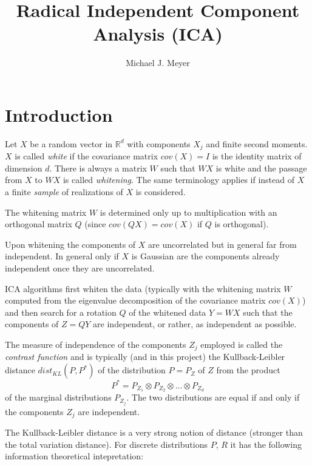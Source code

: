 \documentclass[
10pt,
fleqn,
nosumlimits,
nointlimits,
nonamelimits
]
{article}
\newcommand\bbR{{\mathbb R}}
\begin{document}
\title{Radical Independent Component Analysis (ICA)}
\author{Michael J. Meyer}


\maketitle


\section{Introduction}

Let $X$ be a random vector in $\bbR^d$ with components $X_j$ and finite second moments. 
$X$ is called \textit{white} if the covariance matrix $cov(X)=I$ is the identity matrix of dimension $d$. 
There is always a matrix $W$ such that $WX$ is white and the passage from $X$ to $WX$ is called \textit{whitening}.
The same terminology applies if instead of $X$ a finite \textit{sample} of realizations of $X$ is considered.

The whitening matrix $W$ is determined only up to multiplication with an orthogonal matrix $Q$
(since $cov(QX)=cov(X)$ if $Q$ is orthogonal).

Upon whitening the components of $X$ are uncorrelated but in general far from independent.
In general only if $X$ is Gaussian are the components already independent once they are uncorrelated.

ICA algorithms first whiten the data (typically with the whitening matrix $W$ computed from the eigenvalue
decomposition of the covariance matrix $cov(X)$) and then search for a rotation $Q$ of the whitened data 
$Y=WX$ such that the components of $Z=QY$ are independent, or rather, as independent as possible.

The measure of independence of the components $Z_j$ employed is called the \textit{contrast function} and is typically 
(and in this project) the Kullback-Leibler distance $dist_{KL}(P,P^*)$ of the distribution $P=P_Z$ of $Z$ from the product
%
\begin{equation}
\label{P*}
P^*=P_{Z_1}\otimes P_{Z_2}\otimes\dots\otimes P_{Z_d}
\end{equation}
%
of the marginal distributions $P_{Z_j}$.
The two distributions are equal if and only if the components $Z_j$ are independent.

The Kullback-Leibler distance is a very strong notion of distance (stronger than the total variation distance).
For discrete distributions $P$, $R$ it has the following information theoretical intepretation:
\end{document}
